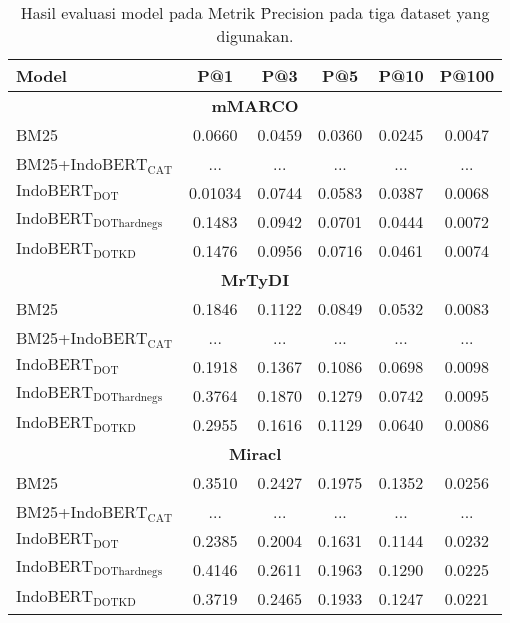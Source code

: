 \newpage

\begin{table}
    \centering
    \caption{Hasil evaluasi model pada Metrik \f{Precision} pada tiga \f{dataset} yang digunakan.}
    \label{tab:evalprecision}
    \begin{tabular}{lccccc}
        \hline
        Model & P@1 & P@3 & P@5 & P@10 & P@100 \\
        \hline
        \multicolumn{6}{c}{\textbf{mMARCO}} \\
        BM25 & 0.0660 & 0.0459 & 0.0360 & 0.0245 & 0.0047 \\
        BM25+$\text{IndoBERT}_{\text{CAT}}$  & ... & ... & ... & ... & ... \\
        $\text{IndoBERT}_{\text{DOT}}$ & 0.01034 & 0.0744 & 0.0583 & 0.0387 & 0.0068 \\
        $\text{IndoBERT}_{\text{DOThardnegs}} $ & 0.1483 & 0.0942 & 0.0701 & 0.0444 & 0.0072 \\
        $\text{IndoBERT}_{\text{DOTKD}}$ &  0.1476 & 0.0956 & 0.0716 & 0.0461 & 0.0074 \\
        \hline
        \multicolumn{6}{c}{\textbf{MrTyDI}} \\
        BM25 & 0.1846 & 0.1122 & 0.0849 & 0.0532 & 0.0083 \\
        BM25+$\text{IndoBERT}_{\text{CAT}}$  & ... & ... & ... & ... & ... \\
        $\text{IndoBERT}_{\text{DOT}}$ & 0.1918 & 0.1367 & 0.1086 & 0.0698 & 0.0098 \\
        $\text{IndoBERT}_{\text{DOThardnegs}} $ & 0.3764 & 0.1870 & 0.1279 & 0.0742 & 0.0095 \\
        $\text{IndoBERT}_{\text{DOTKD}}$ & 0.2955 & 0.1616 & 0.1129 & 0.0640 & 0.0086 \\
        \hline
        \multicolumn{6}{c}{\textbf{Miracl}} \\
        BM25 & 0.3510 & 0.2427 & 0.1975 & 0.1352 & 0.0256 \\
        BM25+$\text{IndoBERT}_{\text{CAT}}$  & ... & ... & ... & ... & ... \\
        $\text{IndoBERT}_{\text{DOT}}$ & 0.2385 & 0.2004 & 0.1631 & 0.1144 & 0.0232 \\
        $\text{IndoBERT}_{\text{DOThardnegs}} $ & 0.4146 & 0.2611 & 0.1963 & 0.1290 & 0.0225 \\
        $\text{IndoBERT}_{\text{DOTKD}}$ & 0.3719 & 0.2465 & 0.1933 & 0.1247 & 0.0221 \\
        \hline
        
        \end{tabular}
        
\end{table}

